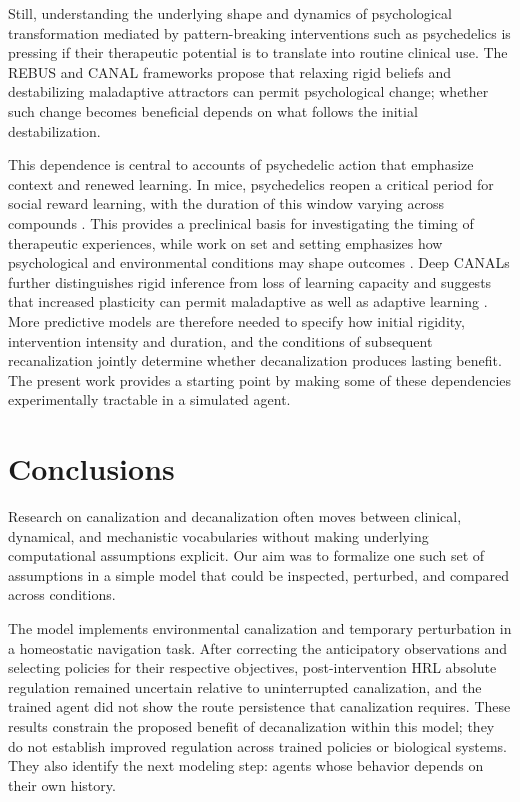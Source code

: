 \documentclass[12pt,fleqn]{article}
\begin{document}
Still, understanding the underlying shape and dynamics of psychological transformation mediated by pattern-breaking interventions such as psychedelics is pressing if their therapeutic potential is to translate into routine clinical use. The REBUS and CANAL frameworks propose that relaxing rigid beliefs and destabilizing maladaptive attractors can permit psychological change; whether such change becomes beneficial depends on what follows the initial destabilization.

This dependence is central to accounts of psychedelic action that emphasize context and renewed learning. In mice, psychedelics reopen a critical period for social reward learning, with the duration of this window varying across compounds \cite{nardou_psychedelics_2023}. This provides a preclinical basis for investigating the timing of therapeutic experiences, while work on set and setting emphasizes how psychological and environmental conditions may shape outcomes \cite{carhart-harris_context_2018}. Deep CANALs further distinguishes rigid inference from loss of learning capacity and suggests that increased plasticity can permit maladaptive as well as adaptive learning \cite{juliani_deep_2024}. More predictive models are therefore needed to specify how initial rigidity, intervention intensity and duration, and the conditions of subsequent recanalization jointly determine whether decanalization produces lasting benefit. The present work provides a starting point by making some of these dependencies experimentally tractable in a simulated agent.

\section{Conclusions}

Research on canalization and decanalization often moves between clinical, dynamical, and mechanistic vocabularies without making underlying computational assumptions explicit. Our aim was to formalize one such set of assumptions in a simple model that could be inspected, perturbed, and compared across conditions.

The model implements environmental canalization and temporary perturbation in a homeostatic navigation task. After correcting the anticipatory observations and selecting policies for their respective objectives, post-intervention HRL absolute regulation remained uncertain relative to uninterrupted canalization, and the trained agent did not show the route persistence that canalization requires. These results constrain the proposed benefit of decanalization within this model; they do not establish improved regulation across trained policies or biological systems. They also identify the next modeling step: agents whose behavior depends on their own history.
\end{document}
